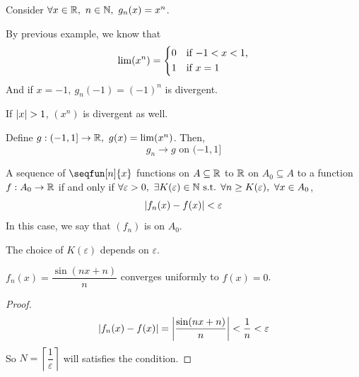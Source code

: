 \documentclass[a4paper,12pt]{article}
\begin{document}
\newpage

\begin{example} Consider \(\forall x\in\R,\ n\in\N,\ g_n(x)=x^n\). 

    By previous example, we know that 
    \[\lim(x^n)=\begin{cases*}
        0 & if \(-1<x<1\),\\
        1 & if \(x=1\)
    \end{cases*}\]
    And if \(x=-1,\ g_n(-1)=(-1)^n\) is divergent. 

    If \(\left\lvert x\right\rvert>1\), \((x^n)\) is divergent as well.

    Define \(g:(-1,1]\rightarrow \R,\ g(x)=\lim(x^n)\). Then, 
    \[g_n\rightarrow g \text{ on } (-1,1]\]

\end{example}

\begin{definition}
    A sequence of \(\seqfun[n ]{x }\) functions on \(A\subseteq\mathbb{R}\) to \(\mathbb{R}\)  on \(A_0\subseteq A\) to a function \(f:A_0\rightarrow\mathbb{R}\) if and only if 
    \(\forall \varepsilon>0,\ \exists K(\varepsilon)\in\N\st\forall n\ge K(\varepsilon),\ \forall x\in A_0\),
    \[\left\lvert f_n(x)-f(x)\right\rvert<\varepsilon\]
    In this case, we say that \((f_n)\) is  on \(A_0\).\\
    \begin{remark}
        The choice of \(K(\varepsilon)\) depends on  \(\varepsilon\).\\
    \end{remark}
\end{definition}

\begin{example}
    \(f_n(x)=\dfrac{\sin(nx+n)}{n}\) converges uniformly to \(f(x)=0\).
    \begin{proof}
        \[\left\lvert f_n(x)-f(x)\right\rvert=\left\lvert \frac{\sin(nx+n)}{n}\right\rvert<\frac{1 }{n }<\varepsilon\]
        So \(N=\left\lceil\dfrac{1}{\varepsilon}\right\rceil\) will satisfies the condition.

    \end{proof}
\end{example}
\end{document}

